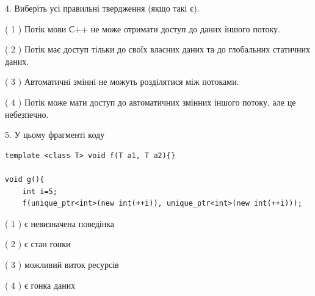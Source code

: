 \documentclass[12pt, ukrainian]{article}
\begin{document}
\begin {large}
{%
4. Виберіть усі правильні твердження (якщо такі є).\par
\vspace{2mm}

( 1 ) Потік мови С++ не може отримати доступ до даних іншого потоку.%

( 2 ) Потік має доступ тільки до своїх власних даних та до глобальних статичних даних.%

( 3 ) Автоматичні змінні не можуть розділятися між потоками.%

( 4 ) Потік може мати доступ до автоматичних змінних іншого потоку, але це небезпечно.%


5. У цьому фрагменті коду
\begin{verbatim}
template <class T> void f(T a1, T a2){}

void g(){
    int i=5;
    f(unique_ptr<int>(new int(++i)), unique_ptr<int>(new int(++i)));
\end{verbatim}

( 1 ) є невизначена поведінка%

( 2 ) є стан гонки%

( 3 ) можливий виток ресурсів%

( 4 ) є гонка даних%
}
\end {large}
\end{document}
